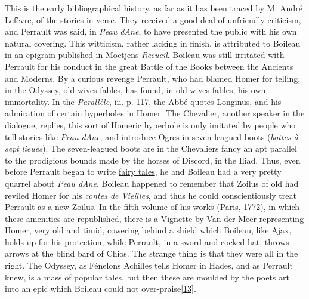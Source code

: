 \documentclass[14pt,a4paper]{memoir}
\newcommand{\ul}[1]{\uline{#1}}
\begin{document}
This is the early bibliographical history, as far as it has been traced
by M. André Lefèvre, of the stories in verse. They received a good deal
of unfriendly criticism, and Perrault was said, in \emph{Peau
d\textquotesingle Ane}, to have presented the public with his own
natural covering. This witticism, rather lacking in finish, is
attributed to Boileau in an epigram published in
Moetjens\textquotesingle{} \emph{Recueil}. Boileau was still irritated
with Perrault for his conduct in the great Battle of the Books between
the Ancients and Moderns. By a curious revenge Perrault, who had blamed
Homer for telling, in the Odyssey, old wives\textquotesingle{} fables,
has found, in old wives\textquotesingle{} fables, his own immortality.
In the \emph{Parallèle}, iii. p. 117, the Abbé quotes Longinus, and his
admiration of certain hyperboles in Homer. The Chevalier, another
speaker in the dialogue, replies, \textquotesingle this sort of Homeric
hyperbole is only imitated by people who tell stories like \emph{Peau
d\textquotesingle Ane}, and introduce Ogres in seven-leagued boots
(\emph{bottes à sept lieues}).\textquotesingle{} The
\textquotesingle seven-leagued boots\textquotesingle{} are in the
Chevalier\textquotesingle s fancy an apt parallel to the prodigious
bounds made by the horses of Discord, in the Iliad. Thus, even before
Perrault began to write \ul{fairy tales}, he and Boileau had a very
pretty quarrel about \emph{Peau d\textquotesingle Ane}. Boileau happened
to remember that Zoilus of old had reviled Homer for his \emph{contes de
Vieilles}, and thus he could conscientiously treat Perrault as a new
Zoilus. In the fifth volume of his works (Paris, 1772), in which these
amenities are republished, there is a Vignette by Van der Meer
representing Homer, very old and timid, cowering behind a shield which
Boileau, like Ajax, holds up for his protection, while Perrault, in a
sword and cocked hat, throws arrows at the blind bard of Chios. The
strange thing is that they were all in the right. The Odyssey, as
Fénelon\textquotesingle s Achilles tells Homer in Hades, and as Perrault
knew, is a mass of popular tales, but then these are moulded by the
poet\textquotesingle s art into an epic which Boileau could not
over-praise\protect\hypertarget{4533318093929944247_33931-h-0.htm.xhtmlux5cux23FNanchor_13}{}{}\protect\hyperlink{4533318093929944247_33931-h-0.htm.xhtmlux5cux23Footnote_13}{{[}13{]}}.
\end{document}
